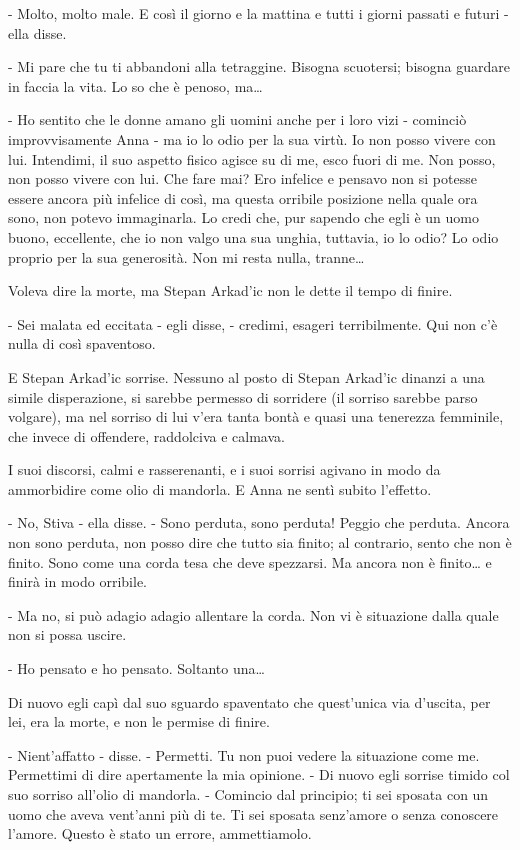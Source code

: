 - Molto, molto male. E così il giorno e la mattina e tutti i giorni passati e futuri - ella disse. 

- Mi pare che tu ti abbandoni alla tetraggine. Bisogna scuotersi; bisogna guardare in faccia la vita. Lo so che è penoso, ma\ldots{} 

- Ho sentito che le donne amano gli uomini anche per i loro vizi - cominciò improvvisamente Anna - ma io lo odio per la sua virtù. Io non posso vivere con lui. Intendimi, il suo aspetto fisico agisce su di me, esco fuori di me. Non posso, non posso vivere con lui. Che fare mai? Ero infelice e pensavo non si potesse essere ancora più infelice di così, ma questa orribile posizione nella quale ora sono, non potevo immaginarla. Lo credi che, pur sapendo che egli è un uomo buono, eccellente, che io non valgo una sua unghia, tuttavia, io lo odio? Lo odio proprio per la sua generosità. Non mi resta nulla, tranne\ldots{} 

Voleva dire la morte, ma Stepan Arkad'ic non le dette il tempo di finire. 

- Sei malata ed eccitata - egli disse, - credimi, esageri terribilmente. Qui non c'è nulla di così spaventoso. 

E Stepan Arkad'ic sorrise. Nessuno al posto di Stepan Arkad'ic dinanzi a una simile disperazione, si sarebbe permesso di sorridere (il sorriso sarebbe parso volgare), ma nel sorriso di lui v'era tanta bontà e quasi una tenerezza femminile, che invece di offendere, raddolciva e calmava. 

I suoi discorsi, calmi e rasserenanti, e i suoi sorrisi agivano in modo da ammorbidire come olio di mandorla. E Anna ne sentì subito l'effetto. 

- No, Stiva - ella disse. - Sono perduta, sono perduta! Peggio che perduta. Ancora non sono perduta, non posso dire che tutto sia finito; al contrario, sento che non è finito. Sono come una corda tesa che deve spezzarsi. Ma ancora non è finito\ldots{} e finirà in modo orribile. 

- Ma no, si può adagio adagio allentare la corda. Non vi è situazione dalla quale non si possa uscire. 

- Ho pensato e ho pensato. Soltanto una\ldots{} 

Di nuovo egli capì dal suo sguardo spaventato che quest'unica via d'uscita, per lei, era la morte, e non le permise di finire. 

- Nient'affatto - disse. - Permetti. Tu non puoi vedere la situazione come me. Permettimi di dire apertamente la mia opinione. - Di nuovo egli sorrise timido col suo sorriso all'olio di mandorla. - Comincio dal principio; ti sei sposata con un uomo che aveva vent'anni più di te. Ti sei sposata senz'amore o senza conoscere l'amore. Questo è stato un errore, ammettiamolo. 

